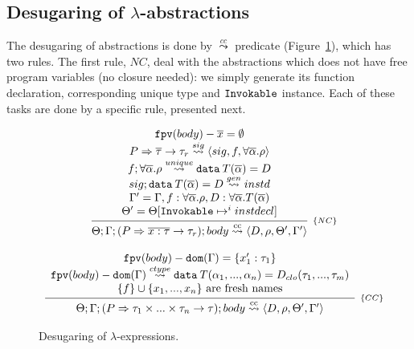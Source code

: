 \documentclass[a4paper, 11pt]{article}
\theoremstyle{definition}
\begin{document}
\subsection{Desugaring of $\lambda$-abstractions}

The desugaring of abstractions is done by $\overset{cc}{\leadsto}$ predicate (Figure~\ref{fig:closurepred}), 
which has two rules. The first rule, $NC$, deal with the abstractions which does not 
have free program variables (no closure needed): we simply generate its 
function declaration, corresponding unique type and $\mathtt{Invokable}$ instance. Each of these 
tasks are done by a specific rule, presented next. 

\begin{figure}[H]
  \[
    \begin{array}{c}
      \infer[_{\{NC\}}]
            {\Theta;\Gamma;(P \Rightarrow \overline{x : \tau} \to \tau_r); body \cc \langle D, \rho, \Theta', \Gamma' \rangle}
            {\begin{array}{c}
              \fpv(body) - \overline{x} = \emptyset\\
              P \Rightarrow \overline{\tau} \to \tau_r \sig \langle sig, f, \forall \overline{\alpha} . \rho \rangle\\ 
              f ; \forall \overline{\alpha}. \rho \unique \mathtt{data}\:T(\overline{\alpha}) = D\\
              sig ; \mathtt{data}\:T(\overline{\alpha}) = D \geninvoke instd\\ 
              \Gamma' = \Gamma, f : \forall\overline{\alpha}.\rho, D : \forall\overline{\alpha} . T(\overline{\alpha})\\
              \Theta' = \Theta [\invokable \mapsto^i instdecl]
             \end{array}}
 \\ \\
      \infer[_{\{CC\}}]
            {\Theta;\Gamma;(P \Rightarrow \tau_1\times ... \times \tau_n \to \tau); body \cc \langle D, \rho, \Theta', \Gamma' \rangle}
            {\begin{array}{c}
              \fpv(body) - \dom{\Gamma} = \{x'_1 : \tau_1\}\\ 
              \fpv(body) - \dom{\Gamma} \closuretype \mathtt{data}\:T(\alpha_1,...,\alpha_n) = D_{clo}(\tau_1,...,\tau_m)\\  
              \{f\}\cup \{x_1, ..., x_n\}\text{ are fresh names} \\
             \end{array}}
    \end{array}
  \]
  \centering
  \caption{Desugaring of $\lambda$-expressions.}
  \label{fig:closurepred}
\end{figure}
\end{document}

